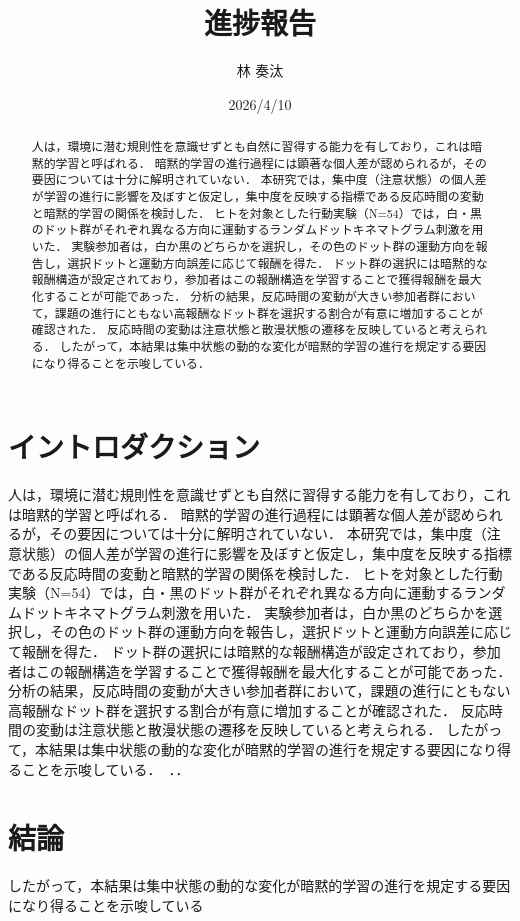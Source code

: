 \documentclass[dvipdfmx]{jsarticle}
\title{進捗報告}
\author{林 奏汰}
\date{2026/4/10}
\begin{document}
\maketitle


\begin{abstract}
人は，環境に潜む規則性を意識せずとも自然に習得する能力を有しており，これは暗黙的学習と呼ばれる．
暗黙的学習の進行過程には顕著な個人差が認められるが，その要因については十分に解明されていない．
本研究では，集中度（注意状態）の個人差が学習の進行に影響を及ぼすと仮定し，集中度を反映する指標である反応時間の変動と暗黙的学習の関係を検討した．
ヒトを対象とした行動実験（N=54）では，白・黒のドット群がそれぞれ異なる方向に運動するランダムドットキネマトグラム刺激を用いた．
実験参加者は，白か黒のどちらかを選択し，その色のドット群の運動方向を報告し，選択ドットと運動方向誤差に応じて報酬を得た．
ドット群の選択には暗黙的な報酬構造が設定されており，参加者はこの報酬構造を学習することで獲得報酬を最大化することが可能であった．
分析の結果，反応時間の変動が大きい参加者群において，課題の進行にともない高報酬なドット群を選択する割合が有意に増加することが確認された．
反応時間の変動は注意状態と散漫状態の遷移を反映していると考えられる．
したがって，本結果は集中状態の動的な変化が暗黙的学習の進行を規定する要因になり得ることを示唆している．
\end{abstract}

\section{イントロダクション}
人は，環境に潜む規則性を意識せずとも自然に習得する能力を有しており，これは暗黙的学習と呼ばれる．
暗黙的学習の進行過程には顕著な個人差が認められるが，その要因については十分に解明されていない．
本研究では，集中度（注意状態）の個人差が学習の進行に影響を及ぼすと仮定し，集中度を反映する指標である反応時間の変動と暗黙的学習の関係を検討した．
ヒトを対象とした行動実験（N=54）では，白・黒のドット群がそれぞれ異なる方向に運動するランダムドットキネマトグラム刺激を用いた．
実験参加者は，白か黒のどちらかを選択し，その色のドット群の運動方向を報告し，選択ドットと運動方向誤差に応じて報酬を得た．
ドット群の選択には暗黙的な報酬構造が設定されており，参加者はこの報酬構造を学習することで獲得報酬を最大化することが可能であった．
分析の結果，反応時間の変動が大きい参加者群において，課題の進行にともない高報酬なドット群を選択する割合が有意に増加することが確認された．
反応時間の変動は注意状態と散漫状態の遷移を反映していると考えられる．
したがって，本結果は集中状態の動的な変化が暗黙的学習の進行を規定する要因になり得ることを示唆している．~\cite{anderson2011value}．．
\section{結論}
したがって，本結果は集中状態の動的な変化が暗黙的学習の進行を規定する要因になり得ることを示唆している

\clearpage


\end{document}
